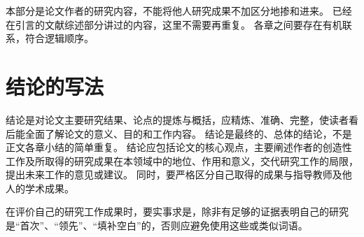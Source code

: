 本部分是论文作者的研究内容，不能将他人研究成果不加区分地掺和进来。
已经在引言的文献综述部分讲过的内容，这里不需要再重复。
各章之间要存在有机联系，符合逻辑顺序。



\section{结论的写法}

结论是对论文主要研究结果、论点的提炼与概括，应精炼、准确、完整，使读者看后能全面了解论文的意义、目的和工作内容。
结论是最终的、总体的结论，不是正文各章小结的简单重复。
结论应包括论文的核心观点，主要阐述作者的创造性工作及所取得的研究成果在本领域中的地位、作用和意义，交代研究工作的局限，提出未来工作的意见或建议。
同时，要严格区分自己取得的成果与指导教师及他人的学术成果。

在评价自己的研究工作成果时，要实事求是，除非有足够的证据表明自己的研究是“首次”、“领先”、“填补空白”的，否则应避免使用这些或类似词语。

